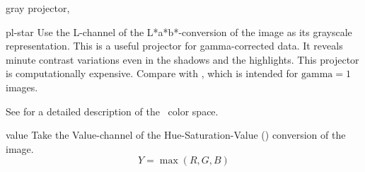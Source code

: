 \begin{codelist}
\begin{codelist}
           {gray projector, }%
  \item[pl-star]\itemend
    Use the L-channel of the L*a*b*-conversion of the image as its grayscale representation.
    This is a useful projector for gamma-corrected data.  It reveals minute contrast variations
    even in the shadows and the highlights.  This projector is computationally expensive.
    Compare with , which is intended for $\mbox{gamma} = 1$ images.

    See  for a detailed description of the
    ~color space.

  \item[value]\itemend
    Take the Value-channel of the Hue-Saturation-Value () conversion of the image.
    \[
    Y = \max(R, G, B)
    \]
  \end{codelist}
\end{codelist}




